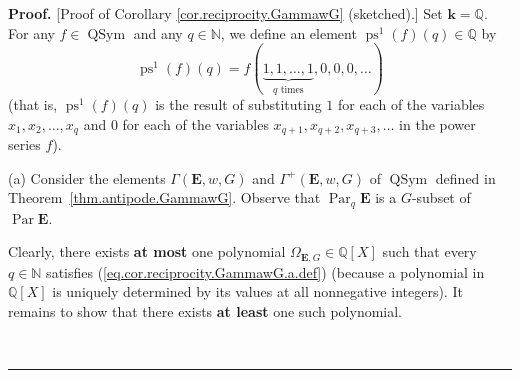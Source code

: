 \documentclass[numbers=enddot,12pt,final,onecolumn,notitlepage,abstracton]{scrartcl}
\theoremstyle{definition}
\newenvironment{proof}[1][Proof]{\noindent\textbf{#1.} }{\ \rule{0.5em}{0.5em}}
\newenvironment{noncompile}{}{}
\newcommand{\kk}{{\mathbf{k}}}
\newcommand{\QSym}{{\operatorname{QSym}}}
\newcommand{\Par}{\operatorname{Par}}
\newcommand{\EE}{{\mathbf{E}}}
\newcommand{\NN}{{\mathbb{N}}}
\newcommand{\QQ}{{\mathbb{Q}}}
\begin{document}
\begin{proof}
[Proof of Corollary \ref{cor.reciprocity.GammawG} (sketched).]
Set $\kk = \QQ$. For any $f \in \QSym$ and any
$q\in \NN $, we define an element $\operatorname{ps}^{1}\left(
f\right)  \left(  q\right)  \in \QQ$ by
\[
\operatorname{ps}^{1}\left(  f\right)  \left(  q\right)  =f\left(
\underbrace{1,1,\ldots,1}_{q\text{ times}},0,0,0,\ldots\right)
\]
(that is, $\operatorname{ps}^{1}\left(  f\right)  \left(  q\right)
$ is the result of substituting $1$ for each of the variables
$x_{1},x_{2},\ldots,x_{q}$ and $0$ for each of the variables
$x_{q+1},x_{q+2},x_{q+3},\ldots$ in the power series $f$).

(a) Consider the elements $\Gamma\left(   \EE ,w,G\right)  $ and
$\Gamma^{+}\left( \EE ,w,G \right)  $ of $\QSym$
defined in Theorem~\ref{thm.antipode.GammawG}. Observe that
$\Par_q \EE$ is a $G$-subset of $\Par \EE$.

\begin{noncompile}
Clearly, there exists \textbf{at most} one polynomial $\Omega_{\EE,
G} \in \QQ \left[  X\right]  $ such that every $q\in \NN $ satisfies
(\ref{eq.cor.reciprocity.GammawG.a.def}) (because a polynomial in
$\QQ \left[  X\right]  $ is uniquely determined by its values at all
nonnegative integers). It remains to show that there exists \textbf{at least}
one such polynomial.
\end{noncompile}


\end{proof}
\end{document}

